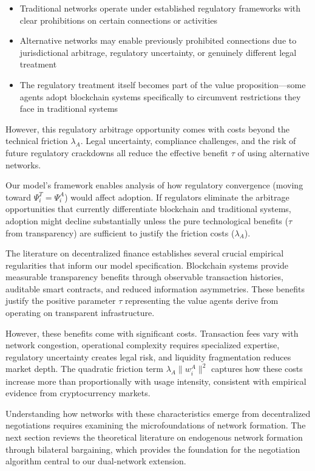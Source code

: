 \begin{itemize}
    \item Traditional networks operate under established regulatory frameworks with clear prohibitions on certain connections or activities
    \item Alternative networks may enable previously prohibited connections due to jurisdictional arbitrage, regulatory uncertainty, or genuinely different legal treatment
    \item The regulatory treatment itself becomes part of the value proposition—some agents adopt blockchain systems specifically to circumvent restrictions they face in traditional systems
\end{itemize}

However, this regulatory arbitrage opportunity comes with costs beyond the technical friction $\lambda_A$. Legal uncertainty, compliance challenges, and the risk of future regulatory crackdowns all reduce the effective benefit $\tau$ of using alternative networks.

Our model's framework enables analysis of how regulatory convergence (moving toward $\Psi_i^T = \Psi_i^A$) would affect adoption. If regulators eliminate the arbitrage opportunities that currently differentiate blockchain and traditional systems, adoption might decline substantially unless the pure technological benefits ($\tau$ from transparency) are sufficient to justify the friction costs ($\lambda_A$).


The literature on decentralized finance establishes several crucial empirical regularities that inform our model specification. Blockchain systems provide measurable transparency benefits through observable transaction histories, auditable smart contracts, and reduced information asymmetries. These benefits justify the positive parameter $\tau$ representing the value agents derive from operating on transparent infrastructure.

However, these benefits come with significant costs. Transaction fees vary with network congestion, operational complexity requires specialized expertise, regulatory uncertainty creates legal risk, and liquidity fragmentation reduces market depth. The quadratic friction term $\lambda_A \|w_i^A\|^2$ captures how these costs increase more than proportionally with usage intensity, consistent with empirical evidence from cryptocurrency markets.

Understanding how networks with these characteristics emerge from decentralized negotiations requires examining the microfoundations of network formation. The next section reviews the theoretical literature on endogenous network formation through bilateral bargaining, which provides the foundation for the negotiation algorithm central to our dual-network extension.


